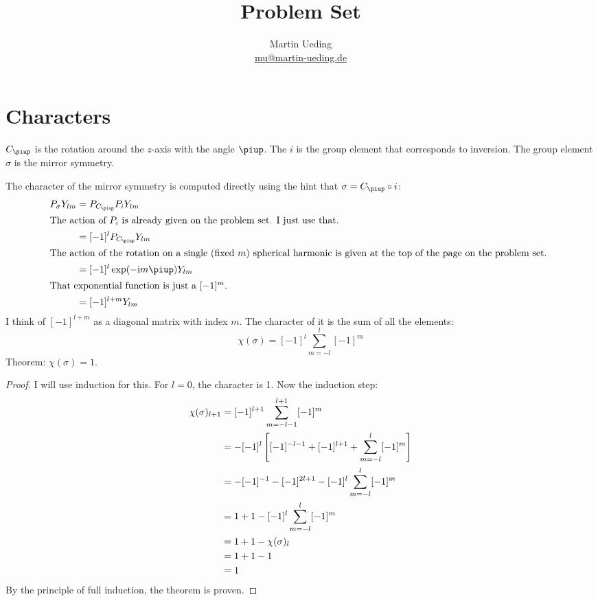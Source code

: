 \documentclass[11pt, english, fleqn, DIV=15, headinclude, BCOR=1cm]{scrartcl}
\title{Problem Set \arabic{problemset}}
\author{
    Martin Ueding \\ \small{\href{mailto:mu@martin-ueding.de}{mu@martin-ueding.de}}
}
\begin{document}
\maketitle

\section{Characters}

$C_\piup$ is the rotation around the $z$-axis with the angle $\piup$. The $i$
is the group element that corresponds to inversion. The group element $\sigma$
is the mirror symmetry.

The character of the mirror symmetry is computed directly using the hint that
$\sigma = C_\piup \circ i$:
\begin{align*}
    P_\sigma Y_{lm}
    &= P_{C_\piup} P_i Y_{lm} \\
    \intertext{%
        The action of $P_i$ is already given on the problem set. I just use
        that.
    }
    &= [-1]^l P_{C_\piup} Y_{lm} \\
    \intertext{%
        The action of the rotation on a single (fixed $m$) spherical harmonic
        is given at the top of the page on the problem set.
    }
    &= [-1]^l \exp(-\iup m \piup) Y_{lm} \\
    \intertext{%
        That exponential function is just a $[-1]^m$.
    }
    &= [-1]^{l+m} Y_{lm}
\end{align*}
I think of $[-1]^{l+m}$ as a diagonal matrix with index $m$. The character of
it is the sum of all the elements:
\[
    \chi(\sigma)
    = [-1]^l \sum_{m=-l}^l [-1]^m
\]
Theorem: $\chi(\sigma) = 1$.
\begin{proof}
    I will use induction for this. For $l = 0$, the character is 1. Now the
    induction step:
    \begin{align*}
        \chi(\sigma)_{l+1}
        &= [-1]^{l+1} \sum_{m=-l-1}^{l+1} [-1]^m \\
        &= - [-1]^{l} \left[ [-1]^{-l-1} + [-1]^{l+1} + \sum_{m=-l}^{l} [-1]^m \right] \\
        &= - [-1]^{-1} - [-1]^{2l+1} - [-1]^{l} \sum_{m=-l}^{l} [-1]^m \\
        &= 1 + 1 - [-1]^{l} \sum_{m=-l}^{l} [-1]^m \\
        &= 1 + 1 - \chi(\sigma)_l \\
        &= 1 + 1 - 1 \\
        &= 1
    \end{align*}
    By the principle of full induction, the theorem is proven.
\end{proof}
\end{document}
